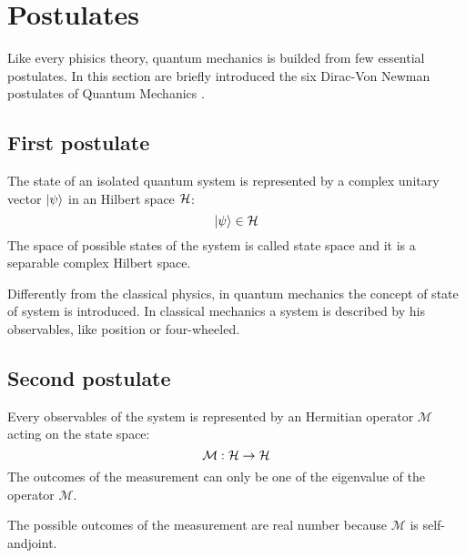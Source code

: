 \section{Postulates}
    Like every phisics theory, quantum mechanics is builded from few 
    essential postulates.
    In this section are briefly introduced the six Dirac-Von Newman 
    postulates of Quantum Mechanics \cite{quantumMec_Dirac,quantumMec_Neumann}.
    
    \subsection{First postulate}
    \begin{postulate}
        The state of an isolated quantum system is represented by a complex unitary 
        vector $\ket{\psi}$ in an Hilbert space $\mathcal{H}$:
        \begin{equation*}
            \ket{\psi} \in \mathcal{H}
        \end{equation*}
        The space of possible states of the system is called state space and it is a
        separable complex Hilbert space.
        \label{post:1}
    \end{postulate}
    \begin{observation*}
        Differently from the classical physics, in quantum mechanics the concept
        of state of system is introduced. In classical mechanics a system is 
        described by his observables, like position or four-wheeled.
    \end{observation*}
    
    \subsection{Second postulate}
    \begin{postulate}[Observables]
        Every observables of the system is represented by an Hermitian operator $\mathcal{M}$
        acting on the state space:
        \begin{equation*}
            \mathcal{M}:\mathcal{H}\to\mathcal{H}
        \end{equation*}
        The outcomes of the measurement can only be one of the eigenvalue of the 
        operator $\mathcal{M}$.
        \label{post:2}
    \end{postulate}
    \begin{observation*}
        The possible outcomes of the measurement are real number because $\mathcal{M}$
        is self-andjoint. 
    \end{observation*}


